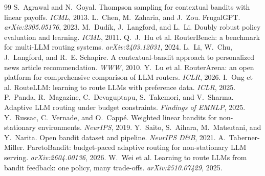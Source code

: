 \documentclass[10pt,twocolumn]{article}
\begin{document}
\begin{thebibliography}{99}\small
{} S.~Agrawal and N.~Goyal.
Thompson sampling for contextual bandits with linear payoffs. \emph{ICML}, 2013.
 L.~Chen, M.~Zaharia, and J.~Zou.
FrugalGPT. \emph{arXiv:2305.05176}, 2023.
 M.~Dud\'ik, J.~Langford, and
L.~Li. Doubly robust policy evaluation and learning. \emph{ICML}, 2011.
 Q.~J.~Hu et al. RouterBench: a
benchmark for multi-LLM routing systems. \emph{arXiv:2403.12031}, 2024.
 L.~Li, W.~Chu, J.~Langford, and
R.~E. Schapire. A contextual-bandit approach to personalized news article
recommendation. \emph{WWW}, 2010.
 Y.~Lu et al. RouterArena: an open
platform for comprehensive comparison of LLM routers. \emph{ICLR}, 2026.
 I.~Ong et al. RouteLLM: learning to
route LLMs with preference data. \emph{ICLR}, 2025.
 P.~Panda, R.~Magazine,
C.~Devaguptapu, S.~Takemori, and V.~Sharma. Adaptive LLM routing under budget
constraints. \emph{Findings of EMNLP}, 2025.
 Y.~Russac, C.~Vernade, and
O.~Capp\'e. Weighted linear bandits for non-stationary environments.
\emph{NeurIPS}, 2019.
 Y.~Saito, S.~Aihara, M.~Matsutani,
and Y.~Narita. Open bandit dataset and pipeline. \emph{NeurIPS D\&B}, 2021.
 A.~Taberner-Miller.
ParetoBandit: budget-paced adaptive routing for non-stationary LLM serving.
\emph{arXiv:2604.00136}, 2026.
 W.~Wei et al. Learning to route LLMs
from bandit feedback: one policy, many trade-offs. \emph{arXiv:2510.07429},
2025.
\end{thebibliography}
\end{document}
